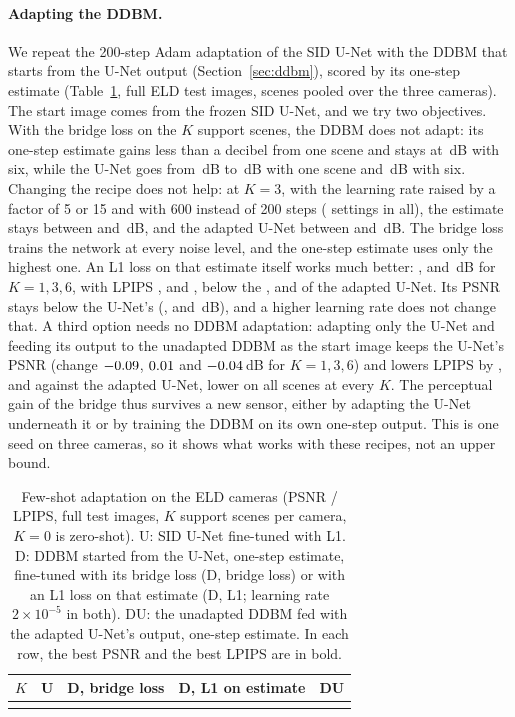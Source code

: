 \paragraph{Adapting the DDBM.} We repeat the 200-step Adam adaptation of the SID U-Net with the DDBM that starts from the U-Net output (Section~\ref{sec:ddbm}), scored by its one-step estimate (Table~\ref{tab:fsddbm}, full ELD test images, \FSSCENES{} scenes pooled over the three cameras). The start image comes from the frozen SID U-Net, and we try two objectives. With the bridge loss on the $K$ support scenes, the DDBM does not adapt: its one-step estimate gains less than a decibel from one scene and stays at \FSDPSNRSIX\,dB with six, while the U-Net goes from \FSZEROU\,dB to \FSUPSNRONE\,dB with one scene and \FSUPSNRSIX\,dB with six. Changing the recipe does not help: at $K=3$, with the learning rate raised by a factor of 5 or 15 and with 600 instead of 200 steps (\SWEEPN{} settings in all), the estimate stays between \SWEEPDMIN{} and \SWEEPDMAX\,dB, and the adapted U-Net between \SWEEPUMIN{} and \SWEEPUMAX\,dB. The bridge loss trains the network at every noise level, and the one-step estimate uses only the highest one. An L1 loss on that estimate itself works much better: \FSRPONE, \FSRPTHREE{} and \FSRPSIX\,dB for $K=1,3,6$, with LPIPS \FSRLONE, \FSRLTHREE{} and \FSRLSIX{}, below the \FSULONE, \FSULTHREE{} and \FSULSIX{} of the adapted U-Net. Its PSNR stays below the U-Net's (\FSUPONE, \FSUPTHREE{} and \FSUPSIX\,dB), and a higher learning rate does not change that. A third option needs no DDBM adaptation: adapting only the U-Net and feeding its output to the unadapted DDBM as the start image keeps the U-Net's PSNR (change $-0.09$, $0.01$ and $-0.04$\,dB for $K=1,3,6$) and lowers LPIPS by \FSDULONE, \FSDULTHREE{} and \FSDULSIX{} against the adapted U-Net, lower on all \FSSCENES{} scenes at every $K$. The perceptual gain of the bridge thus survives a new sensor, either by adapting the U-Net underneath it or by training the DDBM on its own one-step output. This is one seed on three cameras, so it shows what works with these recipes, not an upper bound.

\begin{table}[t]
\centering
\caption{Few-shot adaptation on the ELD cameras (PSNR / LPIPS, full test images, $K$ support scenes per camera, $K=0$ is zero-shot). U: SID U-Net fine-tuned with L1. D: DDBM started from the U-Net, one-step estimate, fine-tuned with its bridge loss (D, bridge loss) or with an L1 loss on that estimate (D, L1; learning rate $2\times10^{-5}$ in both). DU: the unadapted DDBM fed with the adapted U-Net's output, one-step estimate. In each row, the best PSNR and the best LPIPS are in bold.}
\label{tab:fsddbm}
\small
\begin{tabular}{@{}ccccc@{}}
\toprule
$K$ & U & D, bridge loss & D, L1 on estimate & DU \\
\midrule
\\
\bottomrule
\end{tabular}
\end{table}

